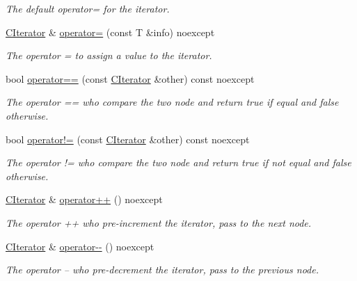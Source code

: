 \begin{DoxyCompactItemize}
\begin{DoxyCompactList}\small\item\em The default operator= for the iterator. \end{DoxyCompactList}\item 
\hyperlink{structnsSdD_1_1CList_1_1CIterator}{C\+Iterator} \& \hyperlink{structnsSdD_1_1CList_1_1CIterator_a3153cc52b78734144f0aceb2d6d315c3}{operator=} (const T \&info) noexcept
\begin{DoxyCompactList}\small\item\em The operator = to assign a value to the iterator. \end{DoxyCompactList}\item 
bool \hyperlink{structnsSdD_1_1CList_1_1CIterator_a16afbe0c358f1f88eb9eafe9093228d0}{operator==} (const \hyperlink{structnsSdD_1_1CList_1_1CIterator}{C\+Iterator} \&other) const noexcept
\begin{DoxyCompactList}\small\item\em The operator == who compare the two node and return true if equal and false otherwise. \end{DoxyCompactList}\item 
bool \hyperlink{structnsSdD_1_1CList_1_1CIterator_ade896f4a807e6c8ac4185b3c060f58f8}{operator!=} (const \hyperlink{structnsSdD_1_1CList_1_1CIterator}{C\+Iterator} \&other) const noexcept
\begin{DoxyCompactList}\small\item\em The operator != who compare the two node and return true if not equal and false otherwise. \end{DoxyCompactList}\item 
\hyperlink{structnsSdD_1_1CList_1_1CIterator}{C\+Iterator} \& \hyperlink{structnsSdD_1_1CList_1_1CIterator_a50bdb955c4141339f69853d59d61f838}{operator++} () noexcept
\begin{DoxyCompactList}\small\item\em The operator ++ who pre-\/increment the iterator, pass to the next node. \end{DoxyCompactList}\item 
\hyperlink{structnsSdD_1_1CList_1_1CIterator}{C\+Iterator} \& \hyperlink{structnsSdD_1_1CList_1_1CIterator_af0398db8fae3641ab46fe3d8806cd185}{operator-\/-\/} () noexcept
\begin{DoxyCompactList}\small\item\em The operator -- who pre-\/decrement the iterator, pass to the previous node. \end{DoxyCompactList}\item 

\end{DoxyCompactItemize}
